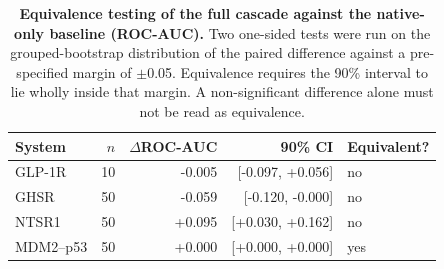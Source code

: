 \begin{table}[tbp]
\centering
\caption{\textbf{Equivalence testing of the full cascade against the native-only
baseline (ROC-AUC).} Two one-sided tests were run on the grouped-bootstrap
distribution of the paired difference against a pre-specified margin of $\pm$0.05.
Equivalence requires the 90\% interval to lie wholly inside that margin. A
non-significant difference alone must not be read as equivalence.}
\label{tab:tost}
\footnotesize
\setlength{\tabcolsep}{6pt}
\begin{tabular}{@{}lrrrl@{}}
\toprule
System & $n$ & $\Delta$ROC-AUC & 90\% CI & Equivalent? \\
\midrule
GLP-1R & 10 & -0.005 & [-0.097, +0.056] & no \\
GHSR & 50 & -0.059 & [-0.120, -0.000] & no \\
NTSR1 & 50 & +0.095 & [+0.030, +0.162] & no \\
MDM2--p53 & 50 & +0.000 & [+0.000, +0.000] & yes \\
\bottomrule
\end{tabular}
\end{table}
